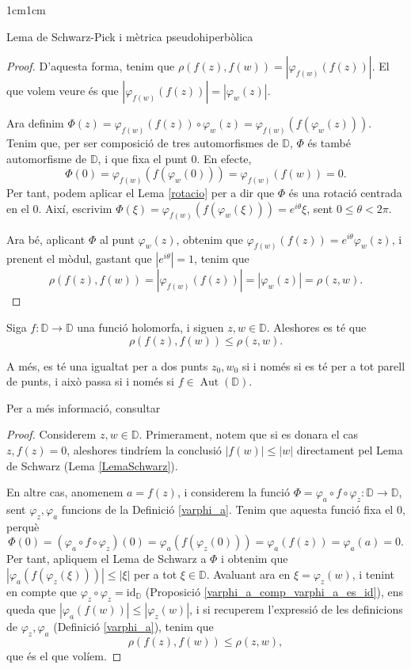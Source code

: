\begin{adjustwidth}{1cm}{1cm}
\begin{subsection}{Lema de Schwarz-Pick i mètrica pseudohiperbòlica}
\begin{proof}
        D'aquesta forma, tenim que $\rho(f(z),f(w))=|\varphi_{f(w)}(f(z))|$. El que volem veure és que $|\varphi_{f(w)}(f(z))|=|\varphi_w(z)|$. 

        Ara definim $\Phi(z)=\varphi_{f(w)}(f(z))\circ \varphi_w(z)=\varphi_{f(w)}(f(\varphi_w(z)))$. Tenim que, per ser composició de tres automorfismes de $\mathbb{D}$, $\Phi$ és també automorfisme de $\mathbb{D}$, i que fixa el punt $0$. En efecte,
        \[
            \Phi(0)=\varphi_{f(w)}(f(\varphi_w(0)))=\varphi_{f(w)}(f(w))=0.
        \]
        Per tant, podem aplicar el Lema \ref{rotacio} per a dir que $\Phi$ és una rotació centrada en el $0$. Així, escrivim $\Phi(\xi)=\varphi_{f(w)}(f(\varphi_w(\xi)))=e^{i\theta}\xi$, sent $0\leq\theta<2\pi$.

        Ara bé, aplicant $\Phi$ al punt $\varphi_w(z)$, obtenim que $\varphi_{f(w)}(f(z))=e^{i\theta}\varphi_w(z)$, i prenent el mòdul, gastant que $|e^{i\theta}|=1$, tenim que 
        \[
            \rho(f(z),f(w))=|\varphi_{f(w)}(f(z))|=|\varphi_w(z)|=\rho(z,w).
        \]
    \end{proof}

\begin{lema}
    Siga $f:\mathbb{D}\to \mathbb{D}$ una funció holomorfa, i siguen $z,w\in \mathbb{D}$. Aleshores es té que 
    \begin{equation}
        \rho(f(z),f(w))\leq\rho(z,w).
        \label{eq_sp}
    \end{equation}
         
    
    A més, es té una igualtat per a dos punts $z_0,w_0$ si i només si es té per a tot parell de punts, i això passa si i només si $f\in\operatorname{Aut}(\mathbb{D})$.

    Per a més informació, consultar \cite[Cap.4, Secció 3]{shapiro}
    \label{schwarz_pick}
\end{lema}

\begin{proof}
    Considerem $z,w\in \mathbb{D}$. Primerament, notem que si es donara el cas $z,f(z)=0$, aleshores tindríem la conclusió $|f(w)|\leq|w|$ directament pel Lema de Schwarz (Lema \ref{LemaSchwarz}).

    En altre cas, anomenem $a=f(z)$, i considerem la funció $\Phi=\varphi_{a}\circ f\circ \varphi_z:\mathbb{D}\to \mathbb{D}$, sent $\varphi_z, \varphi_{a}$ funcions de la Definició \ref{varphi_a}. Tenim que aquesta funció fixa el $0$, perquè
    \[
        \Phi(0)=(\varphi_{a}\circ f\circ \varphi_z)(0)=\varphi_{a}(f(\varphi_z(0)))=\varphi_{a}(f(z))=\varphi_{a}(a)=0.
    \]
    Per tant, apliquem el Lema de Schwarz a $\Phi$ i obtenim que $|\varphi_{a}(f(\varphi_z(\xi)))|\leq|\xi|$ per a tot $\xi\in \mathbb{D}$. Avaluant ara en $\xi=\varphi_z(w)$, i tenint en compte que $\varphi_z\circ\varphi_z=\operatorname{id_{\mathbb{D}}}$ (Proposició \ref{varphi_a_comp_varphi_a_es_id}), ens queda que $|\varphi_{a}(f(w))|\leq|\varphi_z(w)|$, i si recuperem l'expressió de les definicions de $\varphi_z, \varphi_{a}$ (Definició \ref{varphi_a}), tenim que
    \[
        \rho(f(z),f(w))\leq\rho(z,w),
    \]
    que és el que volíem.


\end{proof}
\end{subsection}
\end{adjustwidth}
